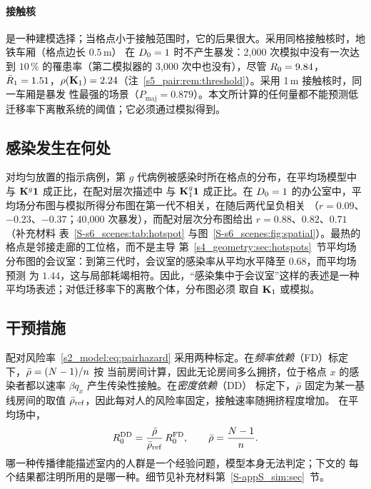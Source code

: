 \paragraph{接触核}是一种建模选择；当格点小于接触范围时，它的后果很大。采用同格接触核时，地铁车厢（格点边长 $0.5$\,m）
在 $D_0=1$ 时不产生暴发：2{,}000 次模拟中没有一次达到 $10\,\%$ 的罹患率（第二模拟器的 3{,}000 次中也没有），尽管
$R_0=9.84$，$\bar{R}_1=1.51$，$\rho(\mathbf{K}_1)=2.24$（注~\ref{s5_pair:rem:threshold}）。采用 1\,m 接触核时，同一车厢是暴发
性最强的场景（$P_{\mathrm{maj}}=0.879$）。本文所计算的任何量都不能预测低迁移率下离散系统的阈值；它必须通过模拟得到。

\subsection{感染发生在何处}\label{s6_scenes:sec:hotspot}

对均匀放置的指示病例，第 $g$ 代病例被感染时所在格点的分布，在平均场模型中与 $\mathbf{K}^{g}\boldsymbol{1}$ 成正比，在配对层次描述中
与 $\mathbf{K}_1^{g}\boldsymbol{1}$ 成正比。在 $D_0=1$ 的办公室中，平均场分布图与模拟所得分布图在第一代不相关，在随后两代呈负相关
（$r=0.09$、$-0.23$、$-0.37$；40{,}000 次暴发），而配对层次分布图给出 $r=0.88$、$0.82$、$0.71$（补充材料
表~\ref{S-s6_scenes:tab:hotspot} 与图~\ref{S-s6_scenes:fig:spatial}）。最热的格点是邻接走廊的工位格，而不是主导
第~\ref{s4_geometry:sec:hotspots}~节平均场分布图的会议室：到第三代时，会议室的感染率从平均水平降至 $0.68$，而平均场预测
为 $1.44$，这与局部耗竭相符。因此，“感染集中于会议室”这样的表述是一种平均场表述；对低迁移率下的离散个体，分布图必须
取自 $\mathbf{K}_1$ 或模拟。

\subsection{干预措施}\label{s6_scenes:sec:interventions}

配对风险率~\eqref{s2_model:eq:pairhazard} 采用两种标定。在\emph{频率依赖}（FD）标定下，$\bar{\rho}=(N-1)/n$ 按
当前房间计算，因此无论房间多么拥挤，位于格点 $x$ 的感染者都以速率 $\beta q_x$ 产生传染性接触。在\emph{密度依赖}（DD）
标定下，$\bar{\rho}$ 固定为某一基线房间的取值 $\bar{\rho}_{\mathrm{ref}}$，因此每对人的风险率固定，接触速率随拥挤程度增加。
在平均场中，
\begin{equation}\label{s7_interventions:eq:dd}
  R_0^{\mathrm{DD}}=\frac{\bar{\rho}}{\bar{\rho}_{\mathrm{ref}}}\,R_0^{\mathrm{FD}},\qquad
  \bar{\rho}=\frac{N-1}{n}.
\end{equation}
哪一种传播律能描述室内的人群是一个经验问题\citep{mccallum2001should,begon2002clarification}，模型本身无法判定；下文的
每个结果都注明所用的是哪一种。细节见补充材料第~\ref{S-appS_sim:sec}~节。

